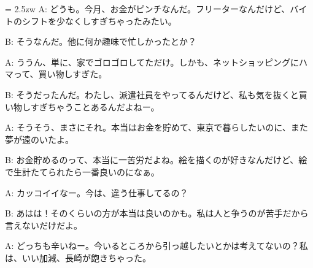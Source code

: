 \documentclass[11pt]{amsart}
\title{}
\author{}
\newenvironment{hangall}[1]{\hangindent = 2.5zw\everypar{\hangindent = 2.5zw}}{}
\begin{document}
\maketitle
\begin{hangall}{}%
A: どうも。今月、お金がピンチなんだ。フリーターなんだけど、バイトのシフトを少なくしすぎちゃったみたい。



B: そうなんだ。他に何か趣味で忙しかったとか？



A: ううん、単に、家でゴロゴロしてただけ。しかも、ネットショッピングにハマって、買い物しすぎた。



B: そうだったんだ。わたし、派遣社員をやってるんだけど、私も気を抜くと買い物しすぎちゃうことあるんだよねー。



A: そうそう、まさにそれ。本当はお金を貯めて、東京で暮らしたいのに、また夢が遠のいたよ。



B: お金貯めるのって、本当に一苦労だよね。絵を描くのが好きなんだけど、絵で生計たてられたら一番良いのになぁ。



A: カッコイイなー。今は、違う仕事してるの？



B: あはは！そのくらいの方が本当は良いのかも。私は人と争うのが苦手だから言えないだけだよ。



A: どっちも辛いねー。今いるところから引っ越したいとかは考えてないの？私は、いい加減、長崎が飽きちゃった。\end{hangall}
\end{document}
